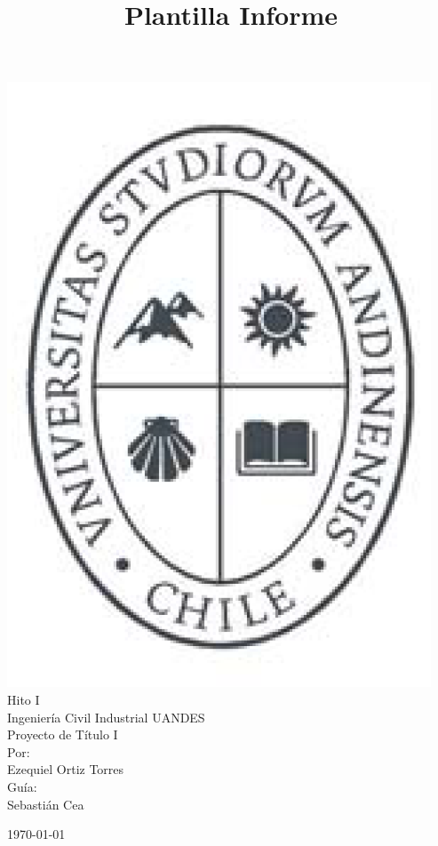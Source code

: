 \documentclass[11pt,letterpaper]{article}
\title{Plantilla Informe}
\begin{document}

\begin{titlepage}

\begin{center}
\includegraphics[scale=0.3]{Log.png}\\
\vspace{1.0cm} {\LARGE Hito I\\ Ingenier\'ia Civil Industrial UANDES\\  Proyecto de T\'itulo I} \\

\vspace{1.5cm} \LARGE{Por:\\ Ezequiel Ortiz Torres \\ Gu\'ia: \\ Sebasti\'an Cea}

\vspace{2.3cm}

\vspace{.5cm} \today

\end{center}
\end{titlepage}
\end{document}
